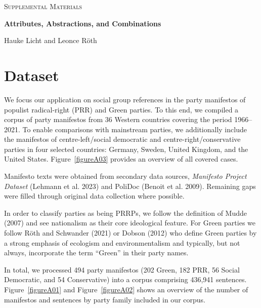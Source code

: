 \documentclass[12pt]{article}
\begin{document}
\clearpage
\appendix
\setcounter{page}{1}
\begin{center}
\Huge \scshape Supplemental Materials \par
\LARGE \bfseries Attributes, Abstractions, and Combinations \par
\medskip
\Large \normalfont Hauke Licht and Leonce Röth
\bigskip
\end{center}
\vfill
\renewcommand{\contentsname}{Contents}
\startcontents[appendix]
\vfill
\clearpage

\renewcommand\thefigure{\thesection\arabic{figure}}
\renewcommand\thetable{\thesection\arabic{table}}

\section{Dataset}\label{sec-apx_dataset}

We focus our application on social group references in the party manifestos of populist radical-right (PRR) and Green parties.
To this end, we compiled a corpus of party manifestos from 36 Western countries covering the period 1966--2021.
To enable comparisons with mainstream parties, we additionally include the manifestos of centre-left/social democratic and centre-right/conservative parties in four selected countries: Germany, Sweden, United Kingdom, and the United States.
Figure~\ref{figureA03} provides an overview of all covered cases.

Manifesto texts were obtained from secondary data sources, \emph{Manifesto Project Dataset} (Lehmann et al. 2023) and PoliDoc (Benoit et al. 2009).
Remaining gaps were filled through original data collection where possible.

In order to classify parties as being PRRPs, we follow the definition of Mudde (2007) and see nationalism as their core ideological feature.
For Green parties we follow Röth and Schwander (2021) or Dobson (2012) who define Green parties by a strong emphasis of ecologism and environmentalism and typically, but not always, incorporate the term ``Green'' in their party names.

In total, we processed 494 party manifestos (202 Green, 182 PRR, 56 Social Democratic, and 54 Conservative) into a corpus comprising 436,941 sentences.
Figure~\ref{figureA01} and Figure~\ref{figureA02} shows an overview of the number of manifestos and sentences by party family included in our corpus.
\end{document}
